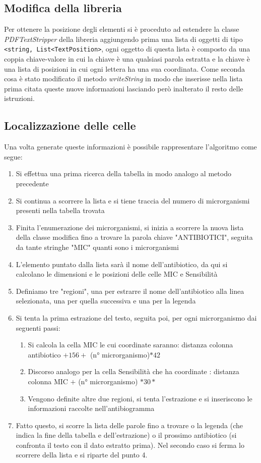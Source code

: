 \subsection{Modifica della libreria}
Per ottenere la posizione degli elementi si è proceduto ad estendere la classe \textit{PDFTextStripper} della libreria aggiungendo prima una lista di oggetti di tipo \texttt{<string, List<TextPosition>}, ogni oggetto di questa lista è composto da una coppia chiave-valore in cui la chiave è una qualsiasi parola estratta e la chiave è una lista di posizioni in cui ogni lettera ha una sua coordinata.
Come seconda cosa è stato modificato il metodo \textit{writeString} in modo che inserisse nella lista prima citata queste nuove informazioni lasciando però inalterato il resto delle istruzioni.
\newline
\subsection{Localizzazione delle celle}
Una volta generate queste informazioni è possibile rappresentare l'algoritmo come segue:
\begin{enumerate}
	\item Si effettua una prima ricerca della tabella in modo analogo al metodo precedente
	\item Si continua a scorrere la lista e si tiene traccia del numero di microrganismi presenti nella tabella trovata
	\item Finita l'enumerazione dei microrganismi, si inizia a scorrere la nuova lista della classe modifica fino a trovare la parola chiave "ANTIBIOTICI", seguita da tante stringhe "MIC" quanti sono i microrganismi
	\item L'elemento puntato dalla lista sarà il nome dell'antibiotico, da qui si calcolano le dimensioni e le posizioni delle celle MIC e Sensibilità
	\item Definiamo tre "regioni", una per estrarre il nome dell'antibiotico alla linea selezionata, una per quella successiva e una per la legenda
	\item Si tenta la prima estrazione del testo, seguita poi, per ogni microrganismo dai seguenti passi:
	\begin{enumerate}
		\item Si calcola la cella MIC le cui coordinate saranno: distanza colonna antibiotico $ + 156 + $ (n° microrganismo)$*42$
		\item Discorso analogo per la cella Sensibilità che ha coordinate : distanza colonna MIC $ + $ (n° microrganismo) $*30*$
		\item Vengono definite altre due regioni, si tenta l'estrazione e si inseriscono le informazioni raccolte nell'antibiogramma
		\end{enumerate}
		\item Fatto questo, si scorre la lista delle parole fino a trovare o la legenda (che indica la fine della tabella e dell'estrazione) o il prossimo antibiotico (si confronta il testo con il dato estratto prima). Nel secondo caso si ferma lo scorrere della lista e si riparte del punto 4.
		\end{enumerate}
